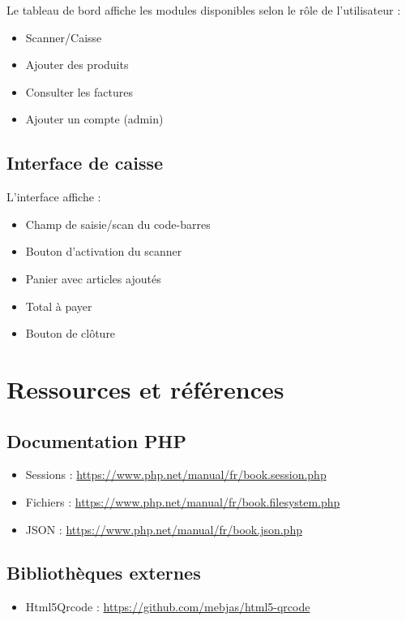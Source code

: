 \documentclass[12pt,a4paper,french]{report}
\begin{document}
Le tableau de bord affiche les modules disponibles selon le rôle de l'utilisateur :
\begin{itemize}
    \item Scanner/Caisse
    \item Ajouter des produits
    \item Consulter les factures
    \item Ajouter un compte (admin)
\end{itemize}

\section{Interface de caisse}

L'interface affiche :
\begin{itemize}
    \item Champ de saisie/scan du code-barres
    \item Bouton d'activation du scanner
    \item Panier avec articles ajoutés
    \item Total à payer
    \item Bouton de clôture
\end{itemize}

\chapter{Ressources et références}

\section{Documentation PHP}

\begin{itemize}
    \item Sessions : \url{https://www.php.net/manual/fr/book.session.php}
    \item Fichiers : \url{https://www.php.net/manual/fr/book.filesystem.php}
    \item JSON : \url{https://www.php.net/manual/fr/book.json.php}
\end{itemize}

\section{Bibliothèques externes}

\begin{itemize}
    \item Html5Qrcode : \url{https://github.com/mebjas/html5-qrcode}
\end{itemize}
\end{document}
